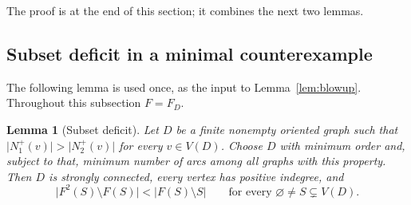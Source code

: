\documentclass[11pt]{article}
\newtheorem{lemma}[theorem]{Lemma}
\theoremstyle{remark}
\newcommand{\abs}[1]{\lvert #1\rvert}
\begin{document}
The proof is at the end of this section; it combines the next two lemmas.

\subsection{Subset deficit in a minimal counterexample}

The following lemma is used once, as the input to Lemma~\ref{lem:blowup}.
Throughout this subsection $F=F_D$.

\begin{lemma}[Subset deficit]
\label{lem:subset-deficit}
Let $D$ be a finite nonempty oriented graph such that
$\abs{N_1^+(v)}>\abs{N_2^+(v)}$ for every $v\in V(D)$.
Choose $D$ with minimum order and, subject to that, minimum number of
arcs among all graphs with this property. Then $D$ is strongly connected,
every vertex has positive indegree, and
\begin{equation}
\label{eq:subset-deficit}
  \abs{F^2(S)\setminus F(S)}<\abs{F(S)\setminus S}
  \qquad\text{for every }\varnothing\ne S\subsetneq V(D).
\end{equation}
\end{lemma}
\end{document}

